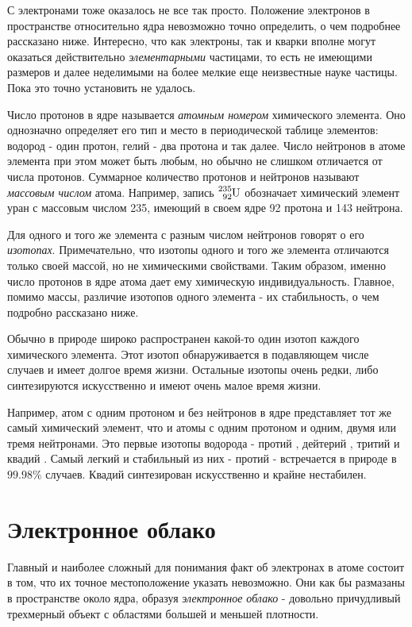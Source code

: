 С электронами тоже оказалось не все так просто.
Положение электронов в пространстве относительно ядра невозможно точно определить, о чем подробнее рассказано ниже.
Интересно, что как электроны, так и кварки вполне могут оказаться действительно \textit{элементарными} частицами, то есть не имеющими размеров и далее неделимыми на более мелкие еще неизвестные науке частицы.
Пока это точно установить не удалось.

Число протонов в ядре называется \textit{атомным номером} химического элемента.
Оно однозначно определяет его тип и место в периодической таблице элементов: водород - один протон, гелий - два протона и так далее.
Число нейтронов в атоме элемента при этом может быть любым, но обычно не слишком отличается от числа протонов.
Суммарное количество протонов и нейтронов называют \textit{массовым числом} атома.
Например, запись $\ce{^{235}_{92}U}$ обозначает химический элемент уран с массовым числом 235, имеющий в своем ядре 92 протона и 143 нейтрона.

Для одного и того же элемента с разным числом нейтронов говорят о его \textit{изотопах}.
Примечательно, что изотопы одного и того же элемента отличаются только своей массой, но не химическими свойствами.
Таким образом, именно число протонов в ядре атома дает ему химическую индивидуальность.
Главное, помимо массы, различие изотопов одного элемента - их стабильность, о чем подробно рассказано ниже.

Обычно в природе широко распространен какой-то один изотоп каждого химического элемента.
Этот изотоп обнаруживается в подавляющем числе случаев и имеет долгое время жизни.
Остальные изотопы очень редки, либо синтезируются искусственно и имеют очень малое время жизни. 

Например, атом с одним протоном и без нейтронов в ядре представляет тот же самый химический элемент, что и атомы с одним протоном и одним, двумя или тремя нейтронами. 
Это первые изотопы водорода - протий , дейтерий , тритий  и квадий .
Самый легкий и стабильный из них - протий - встречается в природе в $99.98\%$ случаев.
Квадий синтезирован искусственно и крайне нестабилен.


\section*{Электронное облако}

Главный и наиболее сложный для понимания факт об электронах в атоме состоит в том, что их точное местоположение указать невозможно.
Они как бы размазаны в пространстве около ядра, образуя \textit{электронное облако} - довольно причудливый трехмерный объект с областями большей и меньшей плотности.

